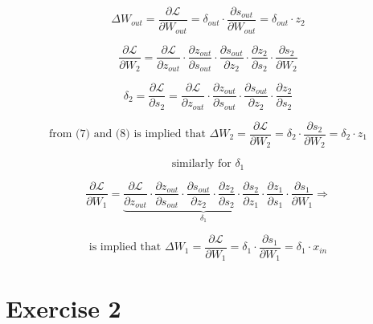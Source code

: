 \documentclass[a4paper]{article}
\begin{document}
\begin{equation}
\Delta W_{out} =\frac{\partial \mathcal{L}}{\partial W_{out}} = \delta_{out} \cdot \frac{\partial s_{out}}{\partial W_{out}} = \delta_{out} \cdot z_{2}
\end{equation}

\begin{equation}
\frac{\partial \mathcal{L}}{\partial W_{2}} = {\frac{\partial \mathcal{L}}{\partial z_{out}} \cdot \frac{\partial z_{out}}{\partial s_{out}} \cdot \frac{\partial s_{out}}{\partial z_{2}} \cdot \frac{\partial z_{2}}{\partial s_{2}}} \cdot \frac{\partial s_{2}}{\partial W_{2}} 
\end{equation}

\begin{equation}
\delta_2 = \frac{\partial \mathcal{L}}{\partial s_{2}} = \frac{\partial \mathcal{L}}{\partial z_{out}} \cdot \frac{\partial z_{out}}{\partial s_{out}} \cdot \frac{\partial s_{out}}{\partial z_{2}} \cdot \frac{\partial z_{2}}{\partial s_{2}} 
\end{equation}

\begin{equation}
\mbox{from (7) and (8) is implied that }
\Delta W_2 = \frac{\partial \mathcal{L}}{\partial W_{2}} = \delta_2 \cdot \frac{\partial s_{2}}{\partial W_{2}} = \delta_2 \cdot z_1
\end{equation}

\begin{equation}
\mbox{similarly for }
\delta_1
\nonumber \end{equation}

\begin{equation}
\frac{\partial \mathcal{L}}{\partial W_{1}} = \underbrace{\frac{\partial \mathcal{L}}{\partial z_{out}} \cdot \frac{\partial z_{out}}{\partial s_{out}} \cdot \frac{\partial s_{out}}{\partial z_{2}} \cdot \frac{\partial z_{2}}{\partial s_{2}} \cdot \frac{\partial s_{2}}{\partial z_{1}} \cdot \frac{\partial z_{1}}{\partial s_{1}}}_{\delta_1} \cdot \frac{\partial s_{1}}{\partial W_{1}} \Rightarrow 
\nonumber \end{equation}

\begin{equation}
\mbox{is implied that }
\Delta W_1 = \frac{\partial \mathcal{L}}{\partial W_{1}} = \delta_1 \cdot \frac{\partial s_{1}}{\partial W_{1}} =\delta_1 \cdot x_{in}
\end{equation}

\section{Exercise 2}
\end{document}
